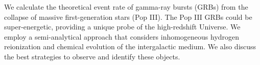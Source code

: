 


\bigskip



\bigskip

\noindent We calculate the theoretical event rate of gamma-ray bursts (GRBs)  from the collapse of massive first-generation stars (Pop III). The Pop III GRBs could be super-energetic, providing a unique probe of the high-redshift Universe. We employ a semi-analytical approach that considers inhomogeneous hydrogen reionization and chemical evolution of the intergalactic medium. We also discuss the best strategies to observe and identify these objects.

